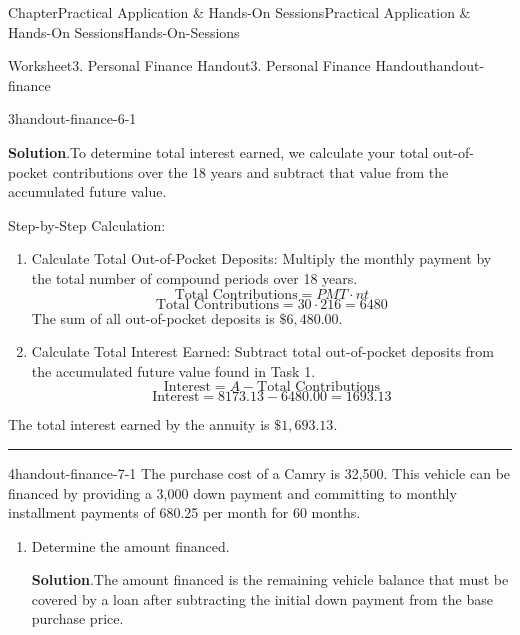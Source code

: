 \documentclass[oneside,10pt,]{book}
\newcommand{\blocktitlefont}{\relax}
\newlength{\workspacestrutwidth}
\begin{document}
\begin{chapterptx}{Chapter}{Practical Application \& Hands-On Sessions}{}{Practical Application \& Hands-On Sessions}{}{}{Hands-On-Sessions}
\begin{worksheet-section}{Worksheet}{3. Personal Finance Handout}{}{3. Personal Finance Handout}{}{}{handout-finance}
\begin{divisionexercise}{3}{}{}{handout-finance-6-1}
\begin{enumerate}[font=\bfseries,label=(\alph*),ref=\alph*]
\noindent\textbf{\blocktitlefont Solution}.\hypertarget{handout-finance-6-1-3-2}{}\quad{}To determine total interest earned, we calculate your total out-of-pocket contributions over the 18 years and subtract that value from the accumulated future value.%
\par
Step-by-Step Calculation:%
\begin{enumerate}[label={(\alph*)}]
\item{}Calculate Total Out-of-Pocket Deposits: Multiply the monthly payment by the total number of compound periods over 18 years.%
\begin{equation*}
\text{Total Contributions} = PMT \cdot nt
\end{equation*}
%
\begin{equation*}
\text{Total Contributions} = 30 \cdot 216 = 6480
\end{equation*}
The sum of all out-of-pocket deposits is \(\$6,480.00\).%
\item{}Calculate Total Interest Earned: Subtract total out-of-pocket deposits from the accumulated future value found in Task 1.%
\begin{equation*}
\text{Interest} = A - \text{Total Contributions}
\end{equation*}
%
\begin{equation*}
\text{Interest} = 8173.13 - 6480.00 = 1693.13
\end{equation*}
%
\end{enumerate}
%
\par
The total interest earned by the annuity is \(\$1,693.13\).%
\par\rule{\workspacestrutwidth}{1in}%
\end{enumerate}%
\end{divisionexercise}%
\clearpage
\begin{divisionexercise}{4}{}{}{handout-finance-7-1}%
The purchase cost of a Camry is \textdollar{}32,500. This vehicle can be financed by providing a \textdollar{}3,000 down payment and committing to monthly installment payments of \textdollar{}680.25 per month for 60 months.%
\begin{enumerate}[font=\bfseries,label=(\alph*),ref=\alph*]%
\item{}Determine the amount financed.%
\par\smallskip%
\noindent\textbf{\blocktitlefont Solution}.\hypertarget{handout-finance-7-1-2-2}{}\quad{}The amount financed is the remaining vehicle balance that must be covered by a loan after subtracting the initial down payment from the base purchase price.%

\end{enumerate}
\end{divisionexercise}
\end{worksheet-section}
\end{chapterptx}
\end{document}

